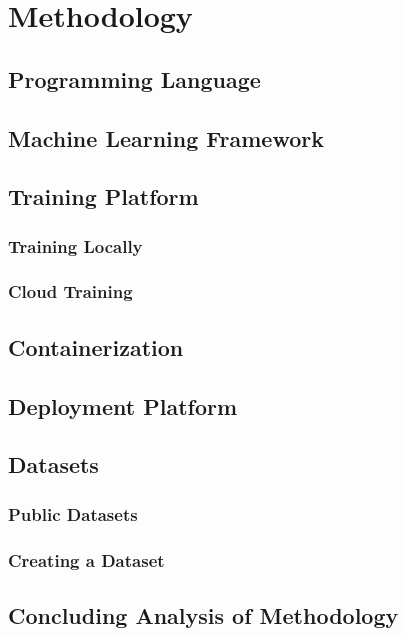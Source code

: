 \chapter{Methodology}

\section{Programming Language}

\section{Machine Learning Framework}

\section{Training Platform}
\subsection{Training Locally}
\subsection{Cloud Training}


\section{Containerization}

\section{Deployment Platform}

\section{Datasets}
\subsection{Public Datasets}
\subsection{Creating a Dataset}

\section{Concluding Analysis of Methodology}
